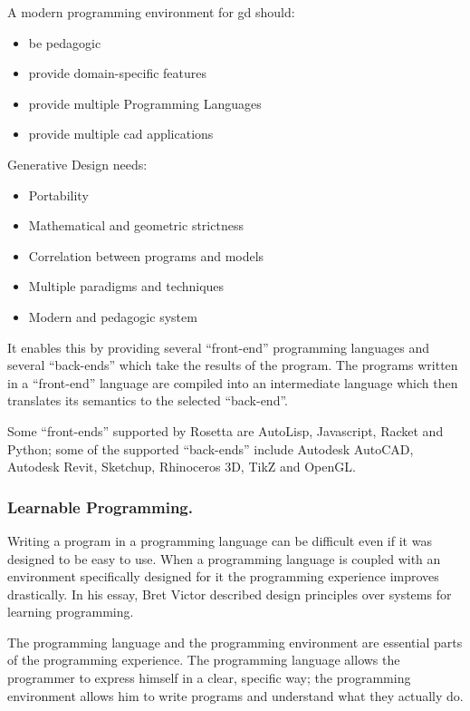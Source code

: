 \documentclass{./llncs2e/llncs}
\begin{document}
	A modern programming environment for \ac{gd} should:
	\begin{itemize}
		\item be pedagogic
		\item provide domain-specific features
		\item provide multiple Programming Languages
		\item provide multiple \ac{cad} applications
	\end{itemize}
	
	Generative Design needs:
	\begin{itemize}
		\item Portability
		\item Mathematical and geometric strictness
		\item Correlation between programs and models
		\item Multiple paradigms and techniques
		\item Modern and pedagogic system
	\end{itemize}
	
	It enables this by providing several ``front-end'' programming languages and several ``back-ends'' which take the results of the program. 
	The programs written in a ``front-end'' language are compiled into an intermediate language which then translates its semantics to the selected ``back-end''\cite{lopes2011portable}.
	
	Some ``front-ends'' supported by Rosetta are AutoLisp, Javascript, Racket and Python; some of the supported ``back-ends'' include Autodesk AutoCAD, Autodesk Revit, Sketchup, Rhinoceros 3D, TikZ and OpenGL.
	

\subsubsection{Learnable Programming.}
	Writing a program in a programming language can be difficult even if it was designed to be easy to use. 
	When a programming language is coupled with an environment specifically designed for it the programming experience improves drastically. 
	In his essay\cite{victor2012learnable}, Bret Victor described design principles over systems for learning programming.
	
	The programming language and the programming environment are essential parts of the programming experience.
	The programming language allows the programmer to express himself in a clear, specific way; the programming environment allows him to write programs and understand what they actually do.
	
\end{document}
